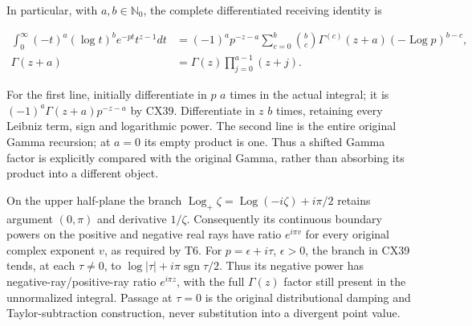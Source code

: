 \documentclass[
  11pt,
]{article}
\begin{document}
In particular, with \(a,b\in\mathbb N_0\), the complete differentiated
receiving identity is

\[
\begin{aligned}
\int_0^\infty(-t)^a(\log t)^b e^{-pt}t^{z-1}dt
 &=(-1)^a p^{-z-a}
       \sum_{c=0}^b\binom bc\Gamma^{(c)}(z+a)
                            (-\operatorname{Log}p)^{b-c},\\
\Gamma(z+a)&=\Gamma(z)\prod_{j=0}^{a-1}(z+j).
\end{aligned}
\tag{CX40}
\]

For the first line, initially differentiate in \(p\) \(a\) times in the
actual integral; it is \((-1)^a\Gamma(z+a)p^{-z-a}\) by CX39.
Differentiate in \(z\) \(b\) times, retaining every Leibniz term, sign
and logarithmic power. The second line is the entire original Gamma
recursion; at \(a=0\) its empty product is one. Thus a shifted Gamma
factor is explicitly compared with the original Gamma, rather than
absorbing its product into a different object.

On the upper half-plane the branch
\(\operatorname{Log}_+\zeta=\operatorname{Log}(-i\zeta)+i\pi/2\) retains
argument \((0,\pi)\) and derivative \(1/\zeta\). Consequently its
continuous boundary powers on the positive and negative real rays have
ratio \(e^{i\pi v}\) for every original complex exponent \(v\), as
required by T6. For \(p=\epsilon+i\tau\), \(\epsilon>0\), the branch in
CX39 tends, at each \(\tau\ne0\), to
\(\log|\tau|+i\pi\operatorname{sgn}\tau/2\). Thus its negative power has
negative-ray/positive-ray ratio \(e^{i\pi z}\), with the full
\(\Gamma(z)\) factor still present in the unnormalized integral. Passage
at \(\tau=0\) is the original distributional damping and
Taylor-subtraction construction, never substitution into a divergent
point value.
\end{document}
